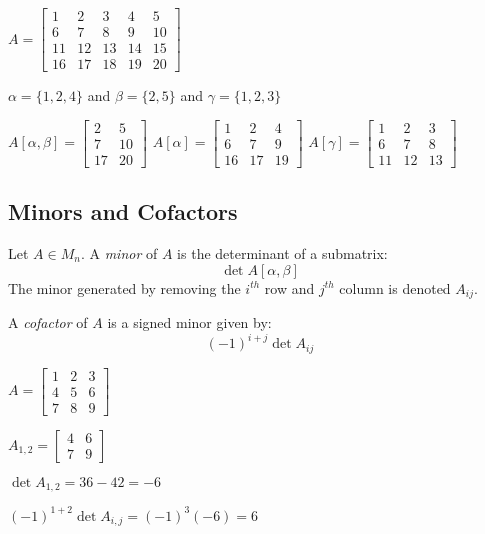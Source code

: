\documentclass[letterpaper,12pt,fleqn]{article}
\renewcommand{\a}{\alpha}
\renewcommand{\b}{\beta}
\newcommand{\g}{\gamma}
\begin{document}
\begin{example}
  $A=\begin{bmatrix}
  1 & 2 & 3 & 4 & 5 \\
  6 & 7 & 8 & 9 & 10 \\
  11 & 12 & 13 & 14 & 15 \\
  16 & 17 & 18 & 19 & 20
  \end{bmatrix}$

  $\a=\{1,2,4\}$ and $\b=\{2,5\}$ and $\g=\{1,2,3\}$

  $A[\a,\b]=\begin{bmatrix}
  2 & 5 \\
  7 & 10 \\
  17 & 20
  \end{bmatrix}$
  \hspace{4ex}
  $A[\a]=\begin{bmatrix}
    1 & 2 & 4 \\
    6 & 7 & 9 \\
    16 & 17 & 19
  \end{bmatrix}$
  \hspace{4ex}
  $A[\g]=\begin{bmatrix}
    1 & 2 & 3 \\
    6 & 7 & 8 \\
    11 & 12 & 13
  \end{bmatrix}$
\end{example}
\newpage
\subsection*{Minors and Cofactors}

\begin{definition}[Minor]
  Let $A\in M_n$. A \emph{minor} of $A$ is the determinant of a submatrix:
  \[\det A[\a,\b]\]
  The minor generated by removing the $i^{th}$ row and $j^{th}$ column is
  denoted $A_{ij}$.

  A \emph{cofactor} of $A$ is a signed minor given by:
  \[(-1)^{i+j}\det A_{ij}\]
\end{definition}

\begin{example}
  $A=\begin{bmatrix}
  1 & 2 & 3 \\
  4 & 5 & 6 \\
  7 & 8 & 9
  \end{bmatrix}$

  $A_{1,2}=\begin{bmatrix}
  4 & 6 \\
  7 & 9
  \end{bmatrix}$

  $\det A_{1,2}=36-42=-6$

  $(-1)^{1+2}\det A_{i,j}=(-1)^3(-6)=6$
\end{example}
\end{document}
